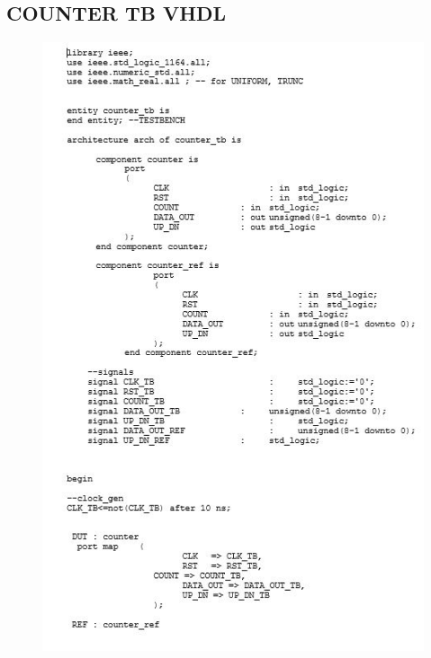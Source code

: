 \subsection{COUNTER TB VHDL}
\begin{figure}[!htb]
	\centering
	\includegraphics[scale=1.2]{immagini/counter_tb1}
	\label{counter_tb1}
\end{figure}

